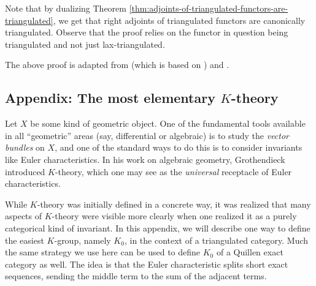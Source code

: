 \begin{remark}
	Note that by dualizing Theorem \ref{thm:adjoints-of-triangulated-functors-are-triangulated}, we get that right adjoints of triangulated functors are canonically triangulated.
	Observe that the proof relies on the functor in question being triangulated and not just lax-triangulated.
\end{remark}
\begin{remark}
	The above proof is adapted from \cite[Thm.\ 47]{murfet-triangulated-categories} (which is based on \cite[Lemma 5.3.6]{neeman-triangulated-categories}) and \cite{4984372}.
\end{remark}

\subsection{Appendix: The most elementary \texorpdfstring{\(K\)}{K}-theory}
Let \(X\) be some kind of geometric object. One of the fundamental tools available in all ``geometric'' areas (say, differential or algebraic) is to study the
\emph{vector bundles} on \(X\), and one of the standard ways to do this is to consider invariants like Euler characteristics. In his work on algebraic geometry,
Grothendieck introduced \(K\)-theory, which one may see as the \emph{universal} receptacle of Euler characteristics.

While \(K\)-theory was initially defined in a concrete way, it was realized that many aspects of \(K\)-theory were visible more clearly when one realized it as
a purely categorical kind of invariant. In this appendix, we will describe one way to define the easiest \(K\)-group, namely \(K_0\), in the context of a triangulated
category. Much the same strategy we use here can be used to define \(K_0\) of a Quillen exact category as well. The idea is that the Euler characteristic splits short exact sequences,
sending the middle term to the sum of the adjacent terms.


